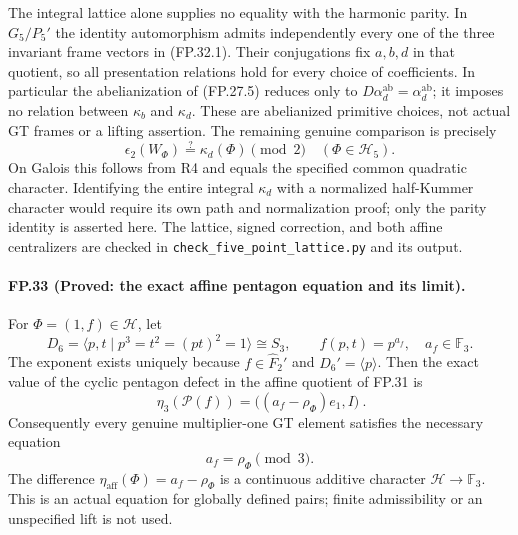 The integral lattice alone supplies no equality with the harmonic
parity. In $G_5/P_5'$ the identity automorphism admits independently
every one of the three invariant frame vectors in (FP.32.1). Their
conjugations fix $a,b,d$ in that quotient, so all presentation relations
hold for every choice of coefficients. In particular the abelianization
of (FP.27.5) reduces only to $D\alpha_d^{\mathrm{ab}}
=\alpha_d^{\mathrm{ab}}$; it imposes no relation between
$\kappa_b$ and $\kappa_d$. These are abelianized primitive choices,
not actual GT frames or a lifting assertion. The remaining genuine
comparison is precisely
\[
 \epsilon_2(W_\Phi)\stackrel{?}{=}\kappa_d(\Phi)\pmod2
 \quad(\Phi\in\mathcal H_5).
\]
On Galois this follows from R4 and equals the specified common
quadratic character. Identifying the entire integral $\kappa_d$ with
a normalized half-Kummer character would require its own path and
normalization proof; only the parity identity is asserted here.
The lattice, signed correction, and both affine centralizers are
checked in \texttt{check\_five\_point\_lattice.py} and its output.

\paragraph{FP.33 (Proved: the exact affine pentagon equation and its limit).}
For $\Phi=(1,f)\in\mathcal H$, let
\[
 D_6=\langle p,t\mid p^3=t^2=(pt)^2=1\rangle\cong S_3,
 \qquad f(p,t)=p^{a_f},\quad a_f\in\mathbb F_3.
 \tag{FP.33.1}
\]
The exponent exists uniquely because $f\in\widehat F_2'$ and
$D_6'=\langle p\rangle$. Then the exact value of the cyclic
pentagon defect in the affine quotient of FP.31 is
\[
 \boxed{\ \eta_3(\mathcal P(f))
             =\bigl((a_f-\rho_\Phi)e_1,I\bigr)\ }.
 \tag{FP.33.2}
\]
Consequently every genuine multiplier-one GT element satisfies the
necessary equation
\[
 a_f=\rho_\Phi\pmod3.
 \tag{FP.33.3}
\]
The difference $\eta_{\mathrm{aff}}(\Phi)=a_f-\rho_\Phi$ is a
continuous additive character $\mathcal H\to\mathbb F_3$.
This is an actual equation for globally defined pairs; finite
admissibility or an unspecified lift is not used.

